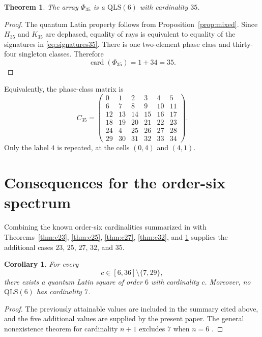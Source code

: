 \documentclass[11pt,a4paper]{article}
\newcommand{\QLS}{\mathrm{QLS}}
\newcommand{\card}{\operatorname{card}}
\newtheorem{theorem}{Theorem}
\newtheorem{corollary}{Corollary}
\begin{document}
\begin{theorem}\label{thm:c35}
The array $\Phi_{35}$ is a $\QLS(6)$ with cardinality $35$.
\end{theorem}

\begin{proof}
The quantum Latin property follows from Proposition~\ref{prop:mixed}.  Since
$H_{35}$ and $K_{35}$ are dephased, equality of rays is equivalent to equality
of the signatures in \eqref{eq:signatures35}.  There is one two-element phase
class and thirty-four singleton classes.  Therefore
\[
 \card(\Phi_{35})=1+34=35.
\]
\end{proof}

Equivalently, the phase-class matrix is
\begin{equation}\label{eq:class35}
C_{35}=
\begin{pmatrix}
0&1&2&3&4&5\\
6&7&8&9&10&11\\
12&13&14&15&16&17\\
18&19&20&21&22&23\\
24&4&25&26&27&28\\
29&30&31&32&33&34
\end{pmatrix}.
\end{equation}
Only the label $4$ is repeated, at the cells $(0,4)$ and $(4,1)$.

\section{Consequences for the order-six spectrum}\label{sec:spectrum}

Combining the known order-six cardinalities summarized in
\cite[Table~6]{ZhangLvCao2026} with Theorems~\ref{thm:c23},
\ref{thm:c25}, \ref{thm:c27}, \ref{thm:c32}, and \ref{thm:c35} supplies the
additional cases $23$, $25$, $27$, $32$, and $35$.

\begin{corollary}\label{cor:order6spectrum}
For every
\[
 c\in[6,36]\setminus\{7,29\},
\]
there exists a quantum Latin square of order $6$ with cardinality $c$.
Moreover, no $\QLS(6)$ has cardinality $7$.
\end{corollary}

\begin{proof}
The previously attainable values are included in the summary cited above,
and the five additional values are supplied by the present paper.  The
general nonexistence theorem for cardinality $n+1$ excludes $7$ when $n=6$
\cite{ZangEtAl2025,ZhangJi2026}.
\end{proof}
\end{document}
